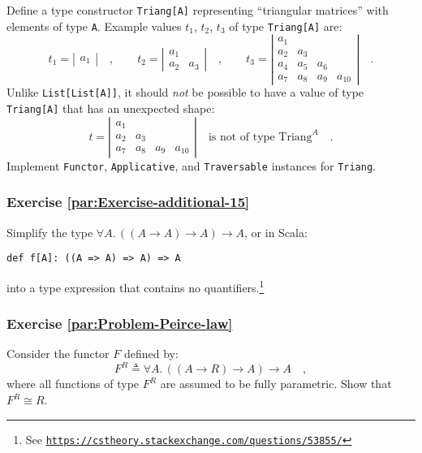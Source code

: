 Define a type constructor \lstinline!Triang[A]! representing \textsf{``}triangular
matrices\textsf{''} with elements of type \lstinline!A!. Example values $t_{1}$,
$t_{2}$, $t_{3}$ of type \lstinline!Triang[A]! are:
\[
t_{1}=\left|\begin{array}{c}
a_{1}\end{array}\right|\quad,\quad\quad t_{2}=\left|\begin{array}{cc}
a_{1}\\
a_{2} & a_{3}
\end{array}\right|\quad,\quad\quad t_{3}=\left|\begin{array}{cccc}
a_{1}\\
a_{2} & a_{3}\\
a_{4} & a_{5} & a_{6}\\
a_{7} & a_{8} & a_{9} & a_{10}
\end{array}\right|\quad.
\]
Unlike \lstinline!List[List[A]]!, it should \emph{not} be possible
to have a value of type \lstinline!Triang[A]! that has an unexpected
shape:
\[
t=\left|\begin{array}{cccc}
a_{1}\\
a_{2} & a_{3}\\
a_{7} & a_{8} & a_{9} & a_{10}
\end{array}\right|\quad\text{is not of type }\text{Triang}^{A}\quad.
\]
 Implement \lstinline!Functor!, \lstinline!Applicative!, and \lstinline!Traversable!
instances for \lstinline!Triang!.

\subsubsection{Exercise \label{par:Exercise-additional-15}\ref{par:Exercise-additional-15}}

Simplify the type $\forall A.\,((A\rightarrow A)\rightarrow A)\rightarrow A$,
or in Scala:
\begin{lstlisting}
def f[A]: ((A => A) => A) => A
\end{lstlisting}
into a type expression that contains no quantifiers.\footnote{See \texttt{\href{https://cstheory.stackexchange.com/questions/53855/}{https://cstheory.stackexchange.com/questions/53855/}}}

\subsubsection{Exercise \label{par:Problem-Peirce-law}\ref{par:Problem-Peirce-law}}

Consider the functor $F$ defined by:
\[
F^{R}\triangleq\forall A.\,((A\rightarrow R)\rightarrow A)\rightarrow A\quad,
\]
where all functions of type $F^{R}$ are assumed to be fully parametric.
Show that $F^{R}\cong R$.

